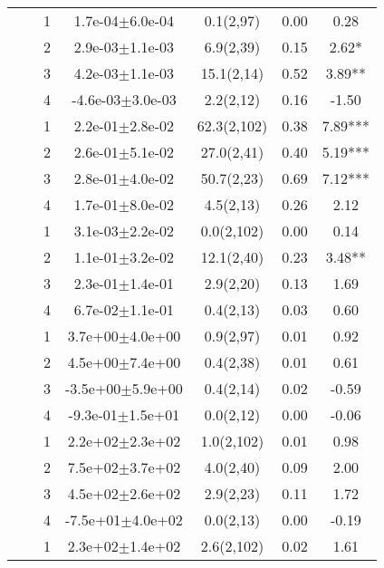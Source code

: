 \begin{longtable}[H]{llccccS[table-format=-2.2, table-space-text-post = {***}]}
   \midrule
{} & {} & 1 &  1.7e-04$\pm$6.0e-04 & 0.1(2,97) & 0.00 & 0.28 \\* 
   &  & 2 &  2.9e-03$\pm$1.1e-03 & 6.9(2,39) & 0.15 & 2.62* \\* 
   &  & 3 &  4.2e-03$\pm$1.1e-03 & 15.1(2,14) & 0.52 & 3.89** \\* 
   &  & 4 & -4.6e-03$\pm$3.0e-03 & 2.2(2,12) & 0.16 & -1.50 \\ 
   \midrule
{} & {} & 1 &  2.2e-01$\pm$2.8e-02 & 62.3(2,102) & 0.38 & 7.89*** \\* 
   &  & 2 &  2.6e-01$\pm$5.1e-02 & 27.0(2,41) & 0.40 & 5.19*** \\* 
   &  & 3 &  2.8e-01$\pm$4.0e-02 & 50.7(2,23) & 0.69 & 7.12*** \\* 
   &  & 4 &  1.7e-01$\pm$8.0e-02 & 4.5(2,13) & 0.26 & 2.12 \\ 
   \midrule
{} & {} & 1 &  3.1e-03$\pm$2.2e-02 & 0.0(2,102) & 0.00 & 0.14 \\* 
   &  & 2 &  1.1e-01$\pm$3.2e-02 & 12.1(2,40) & 0.23 & 3.48** \\* 
   &  & 3 &  2.3e-01$\pm$1.4e-01 & 2.9(2,20) & 0.13 & 1.69 \\* 
   &  & 4 &  6.7e-02$\pm$1.1e-01 & 0.4(2,13) & 0.03 & 0.60 \\ 
   \midrule
{} & {} & 1 &  3.7e+00$\pm$4.0e+00 & 0.9(2,97) & 0.01 & 0.92 \\* 
   &  & 2 &  4.5e+00$\pm$7.4e+00 & 0.4(2,38) & 0.01 & 0.61 \\* 
   &  & 3 & -3.5e+00$\pm$5.9e+00 & 0.4(2,14) & 0.02 & -0.59 \\* 
   &  & 4 & -9.3e-01$\pm$1.5e+01 & 0.0(2,12) & 0.00 & -0.06 \\ 
   \midrule
{} & {} & 1 &  2.2e+02$\pm$2.3e+02 & 1.0(2,102) & 0.01 & 0.98 \\* 
   &  & 2 &  7.5e+02$\pm$3.7e+02 & 4.0(2,40) & 0.09 & 2.00 \\* 
   &  & 3 &  4.5e+02$\pm$2.6e+02 & 2.9(2,23) & 0.11 & 1.72 \\* 
   &  & 4 & -7.5e+01$\pm$4.0e+02 & 0.0(2,13) & 0.00 & -0.19 \\ 
   \midrule
{} & {} & 1 &  2.3e+02$\pm$1.4e+02 & 2.6(2,102) & 0.02 & 1.61 \\* 

\end{longtable}
